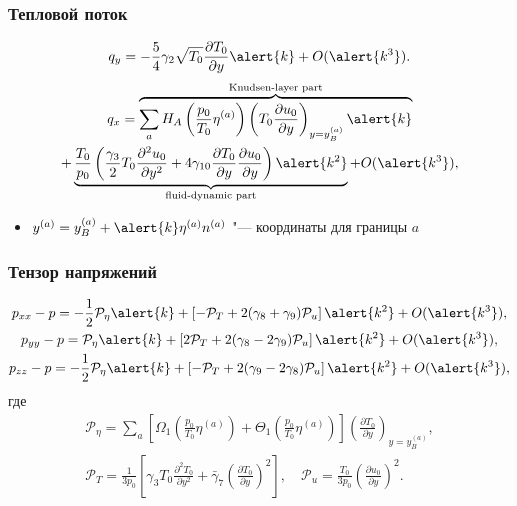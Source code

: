 \documentclass[mathserif]{beamer} %
\newcommand{\pder}[2][]{\frac{\partial#1}{\partial#2}}
\newcommand{\pderdual}[2][]{\frac{\partial^2#1}{\partial#2^2}}
\newcommand{\OO}[1]{O(#1)}
\begin{document}
\begin{frame}
    \frametitle{Тепловой поток}
    \begin{equation}\label{eq:Hilbert_Qy}
        q_y = -\frac54\gamma_2\sqrt{T_0}\pder[T_0]{y}\alert{k} + \OO{\alert{k^3}}.
    \end{equation}
    \pause
    \begin{multline}
        q_x = \overbrace{\sum_a H_A\left(\frac{p_0}{T_0}\eta^{(a)}\right)\left(T_0\pder[u_0]{y}\right)_{y=y_B^{(a)}}\alert{k}}
            ^\text{Knudsen-layer part} \\
            + \underbrace{\frac{T_0}{p_0}\left(\frac{\gamma_3}2 T_0 \pderdual[u_0]{y}
            + 4\gamma_{10} \pder[T_0]{y}\pder[u_0]{y}\right)\alert{k^2}}
            _\text{fluid-dynamic part} + \OO{\alert{k^3}}, \label{eq:Hilbert_Qx}
    \end{multline}

    \begin{itemize}
        \item \(y^{(a)} = y_B^{(a)} + \alert{k}\eta^{(a)} n^{(a)}\) "--- координаты для границы \(a\)
    \end{itemize}
\end{frame}

\begin{frame}
    \frametitle{Тензор напряжений}
    \begin{gather}
        p_{xx} - p = -\frac12\mathcal{P}_\eta \alert{k}
            + \left[-\mathcal{P}_T + 2(\gamma_8+\gamma_9)\mathcal{P}_u\right]\alert{k^2}
            + \OO{\alert{k^3}}, \label{eq:Hilbert_Pxx}\\
        p_{yy} - p = \mathcal{P}_\eta \alert{k}
            + \left[2\mathcal{P}_T + 2(\gamma_8-2\gamma_9)\mathcal{P}_u\right]\alert{k^2}
            + \OO{\alert{k^3}}, \label{eq:Hilbert_Pyy}\\
        p_{zz} - p = -\frac12\mathcal{P}_\eta \alert{k}
            + \left[-\mathcal{P}_T + 2(\gamma_9-2\gamma_8)\mathcal{P}_u\right]\alert{k^2}
            + \OO{\alert{k^3}}, \label{eq:Hilbert_Pzz}
    \end{gather}
    где
    \begin{gather}\label{eq:mathcal_P_def}
        \mathcal{P}_\eta = \sum_a \left[\Omega_1\left(\frac{p_0}{T_0}\eta^{(a)}\right)
            + \Theta_1\left(\frac{p_0}{T_0}\eta^{(a)}\right)\right]\left(\pder[T_0]{y}\right)_{y=y_B^{(a)}}, \\
        \mathcal{P}_T = \frac1{3p_0}\left[\gamma_3 T_0 \pderdual[T_0]{y} + \bar{\gamma}_7\left(\pder[T_0]{y}\right)^2\right], \quad
        \mathcal{P}_u = \frac{T_0}{3p_0}\left(\pder[u_0]{y}\right)^2.
    \end{gather}
\end{frame}
\end{document}
